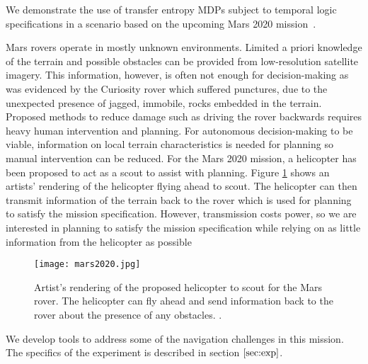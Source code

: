 We demonstrate the use of transfer entropy MDPs subject to temporal logic specifications in a scenario based on the upcoming Mars 2020 mission~\cite{landau2015helicopter}. 

Mars rovers operate in mostly unknown environments. Limited a priori knowledge of the terrain and possible obstacles can be provided from low-resolution satellite imagery. This information, however, is often not enough for decision-making as was evidenced by the Curiosity rover which suffered punctures, due to the unexpected presence of jagged, immobile, rocks embedded in the terrain. Proposed methods to reduce damage such as driving the rover backwards requires heavy human intervention and planning. For autonomous decision-making to be viable, information on local terrain characteristics is needed for planning so manual intervention can be reduced. For the Mars 2020 mission, a helicopter has been proposed to act as a scout \cite{landau2015helicopter} to assist with planning. Figure \ref{fig:mars2020} shows an artists' rendering of the helicopter flying ahead to scout. The helicopter can then transmit information of the terrain back to the rover which is used for planning to satisfy the mission specification. However, transmission costs power, so we are interested in planning to satisfy the mission specification while relying on as little information from the helicopter as possible

\begin{figure}
\centering
\texttt{[image: mars2020.jpg]}
\caption{Artist's rendering of the proposed helicopter to scout for the Mars rover. The helicopter can fly ahead and send information back to the rover about the presence of any obstacles. \cite{landau2015helicopter}.}\label{fig:mars2020}
\end{figure}

We develop tools to address some of the navigation challenges in this mission. The specifics of the experiment is described in section $\ref{sec:exp}$.

